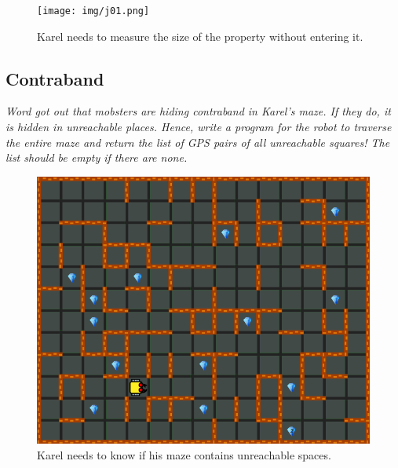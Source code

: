 \begin{figure}[!ht]
\begin{center}
\texttt{[image: img/j01.png]}
\end{center}
\vspace{-4mm}
\caption{Karel needs to measure the size of the property without entering it.}
\label{fig:j01}
\end{figure}

\newpage
\subsection{Contraband}

\noindent
{\em Word got out that mobsters are hiding contraband in Karel's maze. If they do, it is hidden in unreachable places. Hence, write a program for the robot to traverse the entire maze and return the list of GPS pairs of all unreachable squares! The list should be empty if there are none.}

\begin{figure}[!ht]
\begin{center}
\includegraphics[height=0.4\textwidth]{img/j01b.png}
\end{center}
\vspace{-4mm}
\caption{Karel needs to know if his maze contains unreachable spaces.}
\label{fig:j01b}
\end{figure}


